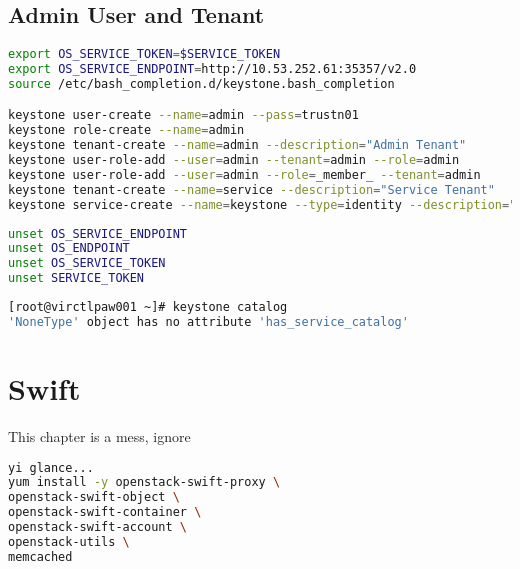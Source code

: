 \documentclass[11pt,letterpaper,oneside]{book}
\begin{document}
\section{Admin User and Tenant}
\begin{lstlisting}[caption={Keystone ???},language=bash]
export OS_SERVICE_TOKEN=$SERVICE_TOKEN
export OS_SERVICE_ENDPOINT=http://10.53.252.61:35357/v2.0
source /etc/bash_completion.d/keystone.bash_completion 

keystone user-create --name=admin --pass=trustn01
keystone role-create --name=admin
keystone tenant-create --name=admin --description="Admin Tenant"
keystone user-role-add --user=admin --tenant=admin --role=admin
keystone user-role-add --user=admin --role=_member_ --tenant=admin
keystone tenant-create --name=service --description="Service Tenant"
keystone service-create --name=keystone --type=identity --description="OpenStack Identity" keystone endpoint-create --service=keystone --publicurl=http://10.53.252.61:5000/v2.0 --internalurl=http://10.53.252.61:5000/v2.0 --adminurl=http://10.53.252.61:35357/v2.0
\end{lstlisting}

\begin{lstlisting}[caption={Unset Environment variables},language=bash]
unset OS_SERVICE_ENDPOINT
unset OS_ENDPOINT
unset OS_SERVICE_TOKEN
unset SERVICE_TOKEN
\end{lstlisting}

\begin{flushleft}
\end{flushleft}


\begin{lstlisting}[caption={Keystone Error Message},language=bash]
[root@virctlpaw001 ~]# keystone catalog 
'NoneType' object has no attribute 'has_service_catalog'
\end{lstlisting}

\chapter{Swift}

\begin{huge} \danger \end{huge} This chapter is a mess, ignore
\begin{lstlisting}[caption={Install Swift},language=bash]
yi glance...
yum install -y openstack-swift-proxy \
openstack-swift-object \
openstack-swift-container \
openstack-swift-account \
openstack-utils \
memcached
\end{lstlisting}
\end{document}

